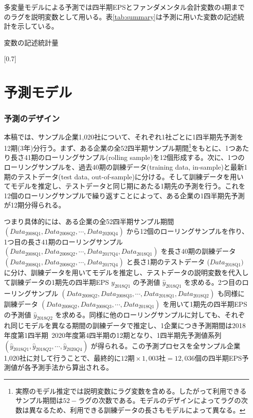 \documentclass[a4paper, 12pt]{jsarticle}
\begin{document}
多変量モデルによる予測では四半期EPSとファンダメンタル会計変数の4期までのラグを説明変数として用いる。表\ref{tab:summary}は予測に用いた変数の記述統計を示している。

\begin{table}
  \centering
  \caption{変数の記述統計量}
  \label{tab:summary}
  \scalebox{0.7}[0.7]{
    
  }
\end{table}

    
\part{予測モデル}

\section{予測のデザイン}

本稿では、サンプル企業1,020社について、それぞれ1社ごとに1四半期先予測を12期(3年)分行う。まず、ある企業の全52四半期サンプル期間\footnote{実際のモデル推定では説明変数にラグ変数を含める。したがって利用できるサンプル期間は$52 - ラグの次数 $である。モデルのデザインによってラグの次数は異なるため、利用できる訓練データの長さもモデルによって異なる。}をもとに、1つあたり長さ41期のローリングサンプル(rolling sample)を12個形成する。次に、1つのローリングサンプルを、過去40期の訓練データ(training data, in-sample)と最新1期のテストデータ(test data, out-of-sample)に分ける。そして訓練データを用いてモデルを推定し、テストデータと同じ期にあたる1期先の予測を行う。これを12個のローリングサンプルで繰り返すことによって、ある企業の1四半期先予測が12期分得られる。

つまり具体的には、ある企業の全52四半期サンプル期間 $(Data_{\text{2008Q1}}, Data_{\text{2008Q2}}, \cdots, Data_{\text{2020Q4}})$ から12個のローリングサンプルを作り、1つ目の長さ41期のローリングサンプル $(Data_{\text{2008Q1}}, Data_{\text{2008Q2}}, \cdots, Data_{\text{2017Q4}}, Data_{\text{2018Q1}})$ を長さ40期の訓練データ $(Data_{\text{2008Q1}}, Data_{\text{2008Q2}}, \cdots, Data_{\text{2017Q4}})$ と長さ1期のテストデータ ($Data_{\text{2018Q1}})$ に分け、訓練データを用いてモデルを推定し、テストデータの説明変数を代入して訓練データの1期先の四半期EPS $y_{2018Q1}$ の予測値 $\hat{y}_{2018Q1}$ を求める。2つ目のローリングサンプル $(Data_{\text{2008Q2}}, Data_{\text{2008Q3}}, \cdots, Data_{\text{2018Q1}}, Data_{\text{2018Q2}})$ も同様に 訓練データ $(Data_{\text{2008Q2}}, Data_{\text{2008Q3}}, \cdots, Data_{\text{2018Q1}})$ を用いて1期先の四半期EPSの予測値 $\hat{y}_{2018Q2}$ を求める。同様に他のローリングサンプルに対しても、それぞれ同じモデルを異なる期間の訓練データで推定し、1企業につき予測期間は2018年度第1四半期~2020年度第4四半期の12期となり、1四半期先予測値系列 $(\hat{y}_{2018Q1}, \hat{y}_{2018Q2}, \cdots, \hat{y}_{2020Q4})$ が得られる。この予測プロセスを全サンプル企業1,020社に対して行うことで、最終的に$12期 \times 1,003社 = 12,036個$の四半期EPS予測値が各予測手法から算出される。
\end{document}

